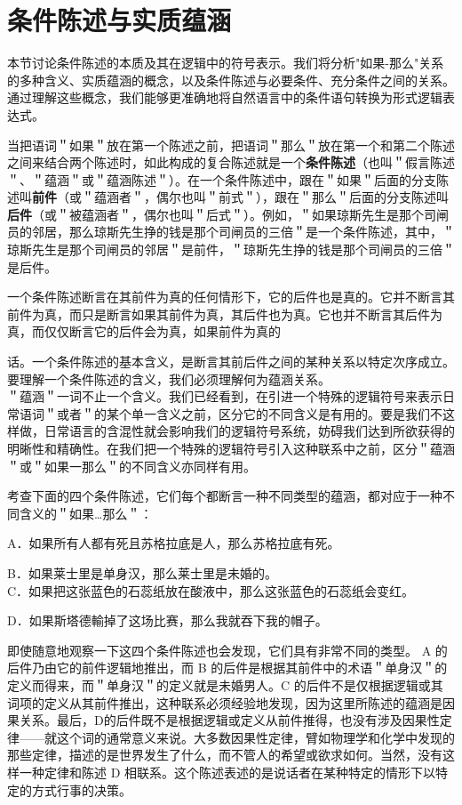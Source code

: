 \section{条件陈述与实质蕴涵}

\begin{logicbox}[title=引言]
本节讨论条件陈述的本质及其在逻辑中的符号表示。我们将分析"如果-那么"关系的多种含义、实质蕴涵的概念，以及条件陈述与必要条件、充分条件之间的关系。通过理解这些概念，我们能够更准确地将自然语言中的条件语句转换为形式逻辑表达式。
\end{logicbox}

当把语词＂如果＂放在第一个陈述之前，把语词＂那么＂放在第一个和第二个陈述之间来结合两个陈述时，如此构成的复合陈述就是一个\textbf{条件陈述}（也叫＂假言陈述＂、＂蕴涵＂或＂蕴涵陈述＂）。在一个条件陈述中，跟在＂如果＂后面的分支陈述叫\textbf{前件}（或＂蕴涵者＂，偶尔也叫＂前式＂），跟在＂那么＂后面的分支陈述叫\textbf{后件}（或＂被蕴涵者＂，偶尔也叫＂后式＂）。例如，＂如果琼斯先生是那个司闸员的邻居，那么琼斯先生挣的钱是那个司闸员的三倍＂是一个条件陈述，其中，＂琼斯先生是那个司闸员的邻居＂是前件，＂琼斯先生挣的钱是那个司闸员的三倍＂是后件。

一个条件陈述断言在其前件为真的任何情形下，它的后件也是真的。它并不断言其前件为真，而只是断言如果其前件为真，其后件也为真。它也并不断言其后件为真，而仅仅断言它的后件会为真，如果前件为真的

话。一个条件陈述的基本含义，是断言其前后件之间的某种关系以特定次序成立。要理解一个条件陈述的含义，我们必须理解何为蕴涵关系。\\
＂蕴涵＂一词不止一个含义。我们已经看到，在引进一个特殊的逻辑符号来表示日常语词＂或者＂的某个单一含义之前，区分它的不同含义是有用的。要是我们不这样做，日常语言的含混性就会影响我们的逻辑符号系统，妨碍我们达到所欲获得的明晰性和精确性。在我们把一个特殊的逻辑符号引入这种联系中之前，区分＂蕴涵＂或＂如果一那么＂的不同含义亦同样有用。

考查下面的四个条件陈述，它们每个都断言一种不同类型的蕴涵，都对应于一种不同含义的＂如果…那么＂：

A．如果所有人都有死且苏格拉底是人，那么苏格拉底有死。

B．如果莱士里是单身汉，那么莱士里是未婚的。\\
C．如果把这张蓝色的石蕊纸放在酸液中，那么这张蓝色的石蕊纸会变红。

D．如果斯塔德輸掉了这场比赛，那么我就吞下我的帽子。

即使随意地观察一下这四个条件陈述也会发现，它们具有非常不同的类型。 A 的后件乃由它的前件逻辑地推出，而 B 的后件是根据其前件中的术语＂单身汉＂的定义而得来，而＂单身汉＂的定义就是未婚男人。C 的后件不是仅根据逻辑或其词项的定义从其前件推出，这种联系必须经验地发现，因为这里所陈述的蕴涵是因果关系。最后，D的后件既不是根据逻辑或定义从前件推得，也没有涉及因果性定律——就这个词的通常意义来说。大多数因果性定律，臂如物理学和化学中发现的那些定律，描述的是世界发生了什么，而不管人的希望或欲求如何。当然，没有这样一种定律和陈述 D 相联系。这个陈述表述的是说话者在某种特定的情形下以特定的方式行事的决策。

